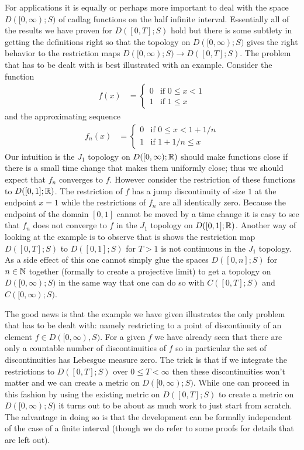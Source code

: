 For applications it is equally or perhaps more important to deal with the space $D([0,\infty); S)$ of cadlag functions on the half infinite interval.  
Essentially all of the results we have proven for $D([0,T]; S)$ hold but there is some subtlety in getting the definitions right so that the topology
on $D([0,\infty); S)$ gives the right behavior to the restriction maps $D([0,\infty); S) \to D([0,T]; S)$.  The problem that has to be dealt with is best 
illustrated with an example.  Consider the function 
\begin{align*}
f(x) &= \begin{cases}
0 & \text{if $0 \leq x < 1$} \\
1 & \text{if $1 \leq x$}
\end{cases}
\end{align*}
and the approximating sequence
\begin{align*}
f_n(x) &= \begin{cases}
0 & \text{if $0 \leq x < 1+1/n$} \\
1 & \text{if $1+1/n \leq x$}
\end{cases}
\end{align*}
Our intuition is the $J_1$ topology on $D([0,\infty); \mathbb{R})$ should make functions close if there is a small time change that makes them
uniformly close; thus we should expect that $f_n$ converges to $f$.  However consider the restriction of these functions to $D([0,1]; \mathbb{R})$.  The restriction of
$f$ has a jump discontinuity of size $1$ at the endpoint $x=1$ while the restrictions of $f_n$ are all identically zero.  Because the endpoint of the domain
$[0,1]$ cannot be moved by a time change it is easy to see that $f_n$ does not converge to $f$ in the $J_1$ topology on $D([0,1]; \mathbb{R})$.  Another way of 
looking at the example is to observe that is shows the restriction map $D([0,T]; S)$ to $D([0,1]; S)$ for $T > 1$ is not continuous in the $J_1$ topology.  As a
side effect of this one cannot simply glue the spaces $D([0,n];S)$ for $n \in \mathbb{N}$ together (formally to create a projective limit) to get a topology on $D([0,\infty); S)$ in the 
same way that one can do so with $C([0,T];S)$ and $C([0,\infty);S)$.  

The good news is that the example we have given illustrates the only problem that has to be
dealt with: namely restricting to a point of discontinuity of an element $f \in D([0,\infty), S)$.  For a given $f$ we have already seen that there are only a countable
number of discontinuities of $f$ so in particular the set of discontinuities has Lebesgue measure zero.  The trick is that if we integrate the restrictions to $D([0,T];S)$ 
over $0 \leq T < \infty$ then these discontinuities won't matter and we can create a metric on $D([0,\infty);S)$.  While one can proceed in this fashion by using the
existing metric on $D([0,T];S)$ to create a metric on $D([0,\infty);S)$ it turns out to be about as much work to just start from scratch.  The advantage in doing so
is that the development can be formally independent of the case of a finite interval (though we do refer to some proofs for details that are left out).  

